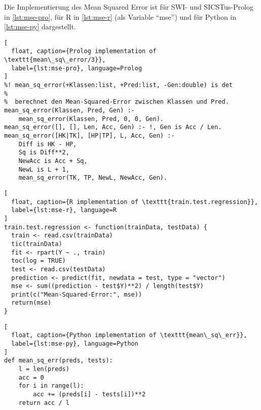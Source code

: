 Die Implementierung des Mean Squared Error ist für SWI- und SICSTus-Prolog in \cref{lst:mse-pro}, für R in \cref{lst:mse-r} (als Variable \enquote{mse})
und für Python in \cref{lst:mse-py} dargestellt.

\begin{lstlisting}[
  float, caption={Prolog implementation of \texttt{mean\_sq\_error/3}},
  label={lst:mse-pro}, language=Prolog
]
%! mean_sq_error(+Klassen:list, +Pred:list, -Gen:double) is det
%
%  berechnet den Mean-Squared-Error zwischen Klassen und Pred.
mean_sq_error(Klassen, Pred, Gen) :-
    mean_sq_error(Klassen, Pred, 0, 0, Gen).
mean_sq_error([], [], Len, Acc, Gen) :- !, Gen is Acc / Len.
mean_sq_error([HK|TK], [HP|TP], L, Acc, Gen) :-
    Diff is HK - HP,
    Sq is Diff**2,
    NewAcc is Acc + Sq,
    NewL is L + 1,
    mean_sq_error(TK, TP, NewL, NewAcc, Gen).
\end{lstlisting}
\begin{lstlisting}[
  float, caption={R implementation of \texttt{train.test.regression}},
  label={lst:mse-r}, language=R
]
train.test.regression <- function(trainData, testData) {
  train <- read.csv(trainData)
  tic(trainData)
  fit <- rpart(Y ~ ., train)
  toc(log = TRUE)
  test <- read.csv(testData)
  prediction <- predict(fit, newdata = test, type = "vector")
  mse <- sum((prediction - test$Y)**2) / length(test$Y)
  print(c("Mean-Squared-Error:", mse))
  return(mse)
}
\end{lstlisting}
\begin{lstlisting}[
  float, caption={Python implementation of \texttt{mean\_sq\_err}},
  label={lst:mse-py}, language=Python
]
def mean_sq_err(preds, tests):
    l = len(preds)
    acc = 0
    for i in range(l):
        acc += (preds[i] - tests[i])**2
    return acc / l
\end{lstlisting}

